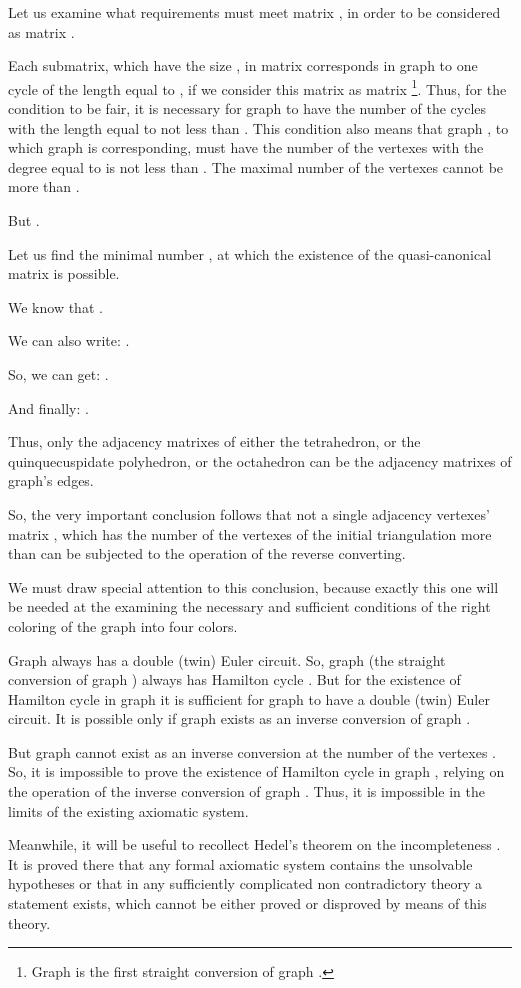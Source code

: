 \documentclass{amsart}
\theoremstyle{plain}
\numberwithin{equation}{section}
\begin{document}
Let us examine what requirements must meet matrix , in order to be considered as matrix .

Each submatrix, which have the size , in matrix  corresponds in graph  to one cycle of the length equal to , if we consider this matrix as matrix \footnote{Graph  is the first straight conversion of graph  \cite{Malinin}.}. Thus, for the condition  to be fair, it is necessary for graph  to have the number of the cycles with the length equal to  not less than . This condition also means that graph , to which graph  is corresponding, must have the number  of the vertexes with the degree equal to  is not less than . The maximal number of the vertexes  cannot be more than . 

But
.

Let us find the minimal number , at which the existence of the quasi-canonical matrix  is possible.

We know that
 . 

We can also write: 
. 

So, we can get: .

And finally: 
.

Thus, only the adjacency matrixes of either the tetrahedron, or the quinquecuspidate polyhedron, or the octahedron can be the adjacency matrixes of graph's  edges.

So, the very important conclusion follows that not a single adjacency vertexes' matrix , which has the number of the vertexes of the initial triangulation more than   can be subjected to the operation of the reverse converting.

We must draw special attention to this conclusion, because exactly this one will be needed at the examining the necessary and sufficient conditions of the right coloring of the graph into four colors.

Graph  always has a double (twin) Euler circuit. So, graph  (the straight conversion of graph ) always has Hamilton cycle \cite {Malinin}. But for the existence of Hamilton cycle in graph  it is sufficient for graph  to have a double (twin) Euler circuit. It is possible only if graph  exists as an inverse conversion of graph .

But graph  cannot exist as an inverse conversion at the number of the vertexes . So, it is impossible to prove the existence of Hamilton cycle in graph , relying on the operation of the inverse conversion of graph . Thus, it is impossible in the limits of the existing axiomatic system.

Meanwhile, it will be useful to recollect Hedel's theorem on the incompleteness \cite {Hedel}. It is proved there that any formal axiomatic system contains the unsolvable hypotheses or that in any sufficiently complicated non contradictory theory a statement exists, which cannot be either proved or disproved by means of this theory.
\end{document}
